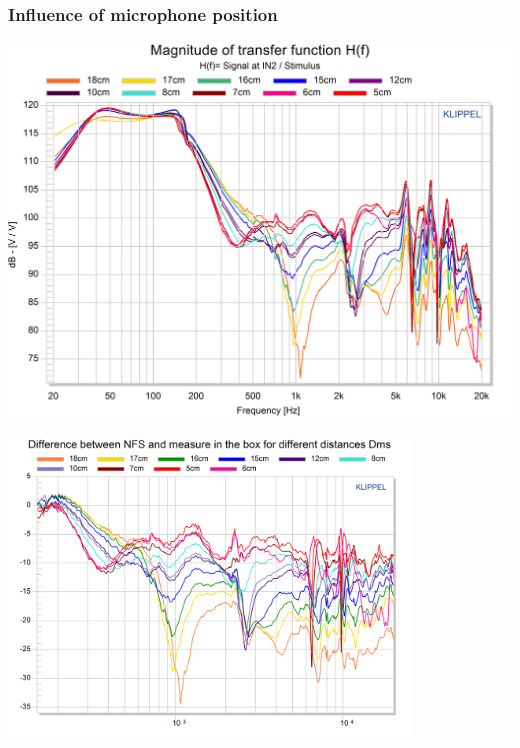 \documentclass{report}
\begin{document}
\begin{appendices}
\subsubsection{Influence of microphone position}
\label{Curves:InfluMicPos}


\begin{center}	
	\includegraphics[scale=0.76,angle=90]{RoomComp/MicPos_TRF} 
	\captionsetup{hypcap=false} 
	\label{fig:micpos_TRF_big}
\end{center}

\begin{center}
	\includegraphics[width=0.8\textwidth]{RoomComp/MicPos_Diff_NFS_TRF_zoom} 
    \captionsetup{hypcap=false} 
	\label{fig:MicPos_Diff_NFS_Zoom}
\end{center}



\end{appendices}
\end{document}
